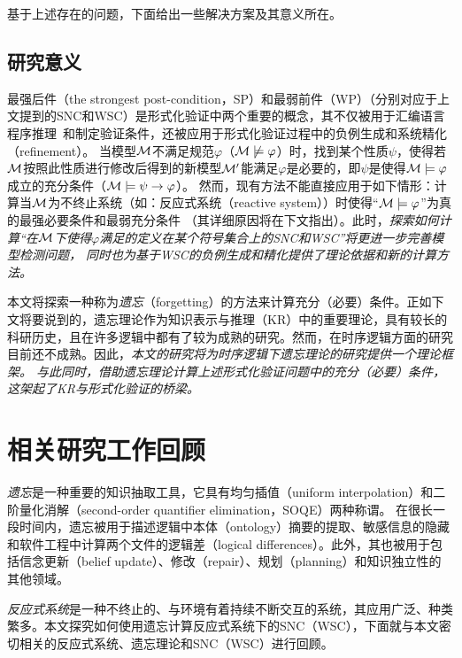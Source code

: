 基于上述存在的问题，下面给出一些解决方案及其意义所在。

\subsection{研究意义}
最强后件（the strongest post-condition，SP）和最弱前件（WP）（分别对应于上文提到的SNC和WSC）是形式化验证中两个重要的概念，其不仅被用于汇编语言程序推理~\cite{legato2002weakest}和制定验证条件\cite{DBLP:journals/ipl/Leino05}，还被应用于形式化验证过程中的负例生成\cite{dailler2018instrumenting}和系统精化（refinement）\cite{woodcock1990refinement}。
当模型${\cal M}$不满足规范$\varphi$（${\cal M}\not \models \varphi$）时，找到某个性质$\psi$，使得若${\cal M}$按照此性质进行修改后得到的新模型${\cal M}'$能满足$\varphi$是必要的，即$\psi$是使得${\cal M}\models \varphi$成立的充分条件（${\cal M} \models \psi\rightarrow \varphi$）。
然而，现有方法不能直接应用于如下情形：计算当${\cal M}$为不终止系统（如：反应式系统（reactive system））时使得“${\cal M}\models \varphi$”为真的最强必要条件和最弱充分条件
（其详细原因将在下文指出）。此时，\emph{探索如何计算“在${\cal M}$下使得$\varphi$满足的定义在某个符号集合上的SNC和WSC”将更进一步完善模型检测问题，
同时也为基于WSC的负例生成和精化提供了理论依据和新的计算方法。}

本文将探索一种称为\emph{遗忘}（forgetting）的方法来计算充分（必要）条件。正如下文将要说到的，遗忘理论作为知识表示与推理（KR）中的重要理论，具有较长的科研历史，且在许多逻辑中都有了较为成熟的研究。然而，在时序逻辑方面的研究目前还不成熟。因此，\emph{本文的研究将为时序逻辑下遗忘理论的研究提供一个理论框架。
与此同时，借助遗忘理论计算上述形式化验证问题中的充分（必要）条件，这架起了KR与形式化验证的桥梁。}

\section{相关研究工作回顾}
\emph{遗忘}是一种重要的知识抽取工具，它具有均匀插值（uniform interpolation）和二阶量化消解（second-order quantifier elimination，SOQE）两种称谓。
在很长一段时间内，遗忘被用于描述逻辑中本体（ontology）摘要的提取、敏感信息的隐藏和软件工程中计算两个文件的逻辑差（logical differences）。此外，其也被用于包括信念更新（belief update）、修改（repair）、规划（planning）和知识独立性的其他领域。

{\em 反应式系统}是一种不终止的、与环境有着持续不断交互的系统，其应用广泛、种类繁多。本文探究如何使用遗忘计算反应式系统下的SNC（WSC），下面就与本文密切相关的反应式系统、遗忘理论和SNC（WSC）进行回顾。



